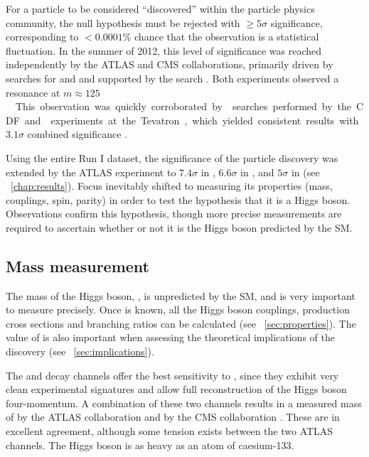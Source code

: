 
For a particle to be considered ``discovered'' within the particle physics community, 
the null hypothesis must be rejected with $\geq\!5\sigma$ significance, 
corresponding to $<0.0001\%$ chance that the observation is a statistical fluctuation.
In the summer of 2012, this level of significance was reached independently by the ATLAS 
and CMS collaborations, primarily driven by searches for \HepProcess{\PHiggs \HepTo 
\Pphoton\Pphoton} and \HepProcess{\PHiggs \HepTo \PZ\PZ} and supported by the \HWW search 
\cite{ATLAS-discovery,CMS-discovery}. Both experiments observed a resonance at 
\unit{$m \approx 125$}{\GeV}.

This observation was quickly corroborated by \HepProcess{\PV\PHiggs \HepTo 
\PV\Pbottom\APbottom} searches performed by the CDF and \dzero experiments at the Tevatron, 
which yielded consistent results with $3.1\sigma$ combined significance 
\cite{Tevatron:2012}.

Using the entire Run I dataset, the significance of the particle discovery was extended 
by the ATLAS experiment to $7.4\sigma$ in \HepProcess{\PHiggs \HepTo \Pphoton\Pphoton} 
\cite{ATLAS:combination:2013}, $6.6\sigma$ in \HepProcess{\PHiggs \HepTo \PZ\PZ} 
\cite{ATLAS:combination:2013}, and $5\sigma$ in \HWW (see 
\Chapter~\ref{chap:results}). Focus inevitably shifted to measuring its properties (mass, 
couplings, spin, parity) in order to test the hypothesis that it is a Higgs boson.
Observations confirm this hypothesis, though more precise measurements are required to 
ascertain whether or not it is the Higgs boson predicted by the SM.



\subsection{Mass measurement}
\label{sec:searches:mass}

The mass of the Higgs boson, \mH, is unpredicted by the SM, and is very important to 
measure precisely. Once \mH is known, all the Higgs boson couplings, production cross 
sections and branching ratios can be calculated (see \Section~\ref{sec:properties}). The 
value of \mH is also important when assessing the theoretical implications of the 
discovery (see \Section~\ref{sec:implications}).

The \HepProcess{\PHiggs \HepTo \Pphoton\Pphoton} and \HepProcess{\PHiggs \HepTo \PZ\PZ} 
decay channels offer the best sensitivity to \mH, since they exhibit very clean 
experimental signatures and allow full reconstruction of the Higgs boson four-momentum.
A combination of these two channels results in a measured mass of 
\unit{}{\GeV} by the ATLAS collaboration \cite{ATLAS:mass} 
and \unit{}{\GeV} by the CMS collaboration \cite{CMS:mass}. 
These are in excellent agreement, although some tension exists between the two ATLAS 
channels. The Higgs boson is as heavy as an atom of caesium-133.

